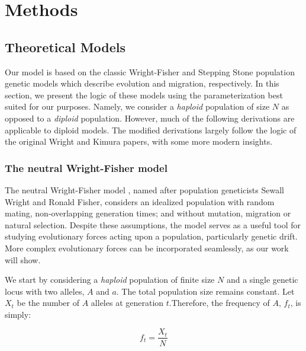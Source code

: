 \chapter{Methods}

\section{Theoretical Models}

Our model is based on the classic Wright-Fisher \cite{wright_evolution_1931}\cite{fisher_mathematical_1922} and Stepping Stone \cite{kimura_stepping_1964} population genetic models which describe evolution and migration, respectively. In this section, we present the logic of these models using the parameterization best suited for our purposes. Namely, we consider a \textit{haploid} population of size $N$ as opposed to a \textit{diploid} population. However, much of the following derivations are applicable to diploid models. The modified derivations largely follow the logic of the original Wright \cite{wright_evolution_1931} and Kimura \cite{kimura_stepping_1964} papers, with some more modern insights.\cite{Rackauckas2014AnII}\cite{tran_introduction_2013} \cite{durrett_probability_2008}


\subsection{The neutral Wright-Fisher model} \label{section:neutral_wf}

The neutral Wright-Fisher model \cite{wright_evolution_1931}\cite{fisher_mathematical_1922}, named after population geneticists Sewall Wright and Ronald Fisher, considers an idealized population with random mating, non-overlapping generation times; and without mutation, migration or natural selection. Despite these assumptions, the model serves as a useful tool for studying evolutionary forces acting upon a population, particularly genetic drift. More complex evolutionary forces can be incorporated seamlessly, as our work will show. 


We start by considering a \textit{haploid} population of finite size $N$ and a single genetic locus with two alleles, $A$ and $a$. The total population size remains constant. Let $X_t$ be the number of $A$ alleles at generation $t$.Therefore, the frequency of $A$, $f_t$, is simply:

\begin{equation}
    f_t = \frac{X_t}{N}
\end{equation}

